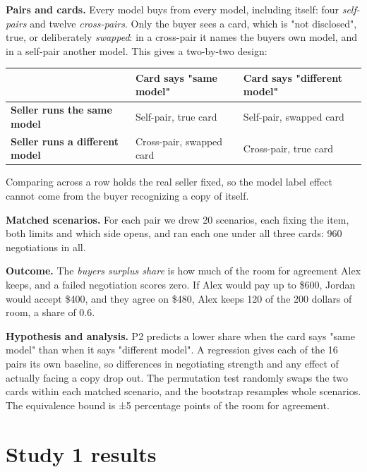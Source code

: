 \documentclass[letterpaper]{article}
\begin{document}
\textbf{Pairs and cards.} Every model buys from every model, including itself: four \emph{self-pairs} and twelve \emph{cross-pairs}. Only the buyer sees a card, which is "not disclosed", true, or deliberately \emph{swapped}: in a cross-pair it names the buyer\textquotesingle s own model, and in a self-pair another model. This gives a two-by-two design:

\begin{center}
\begin{tabular}{@{}>{\raggedright\arraybackslash}p{}>{\raggedright\arraybackslash}p{}>{\raggedright\arraybackslash}p{}@{}}
\toprule
 & Card says "same model" & Card says "different model" \\
\midrule
\textbf{Seller runs the same model} & Self-pair, true card & Self-pair, swapped card \\
\textbf{Seller runs a different model} & Cross-pair, swapped card & Cross-pair, true card \\
\bottomrule
\end{tabular}
\end{center}

Comparing across a row holds the real seller fixed, so the model label effect cannot come from the buyer recognizing a copy of itself.

\textbf{Matched scenarios.} For each pair we drew 20 scenarios, each fixing the item, both limits and which side opens, and ran each one under all three cards: 960 negotiations in all.

\textbf{Outcome.} The \emph{buyer\textquotesingle s surplus share} is how much of the room for agreement Alex keeps, and a failed negotiation scores zero. If Alex would pay up to \$600, Jordan would accept \$400, and they agree on \$480, Alex keeps 120 of the 200 dollars of room, a share of 0.6.

\textbf{Hypothesis and analysis.} P2 predicts a lower share when the card says "same model" than when it says "different model". A regression gives each of the 16 pairs its own baseline, so differences in negotiating strength and any effect of actually facing a copy drop out. The permutation test randomly swaps the two cards within each matched scenario, and the bootstrap resamples whole scenarios. The equivalence bound is ±5 percentage points of the room for agreement.

\section{Study 1 results}
\end{document}
